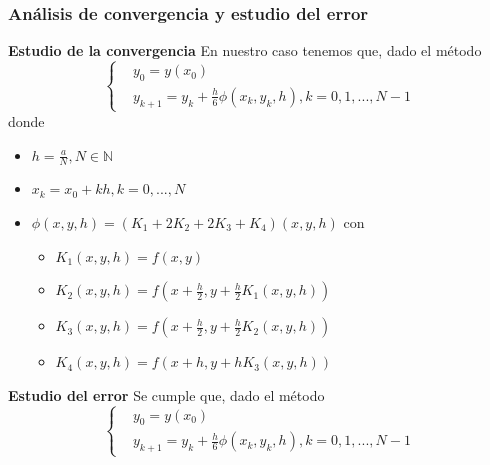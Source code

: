 \documentclass[paper=a4, fontsize=11pt]{scrartcl} %
\numberwithin{equation}{section}
\begin{document}
	\subsubsection{Análisis de convergencia y estudio del error}
	\textbf{Estudio de la convergencia}
	\newline
	En nuestro caso tenemos que, dado el método 
	\begin{equation*}
	[RK4]\begin{cases} 
	&\text{$y_0 = y(x_0)$}
	\\
	&\text{$y_{k+1} = y_k + \frac{h}{6}\phi(x_k,y_k,h) , k= 0,1,...,N-1$} 
	\end{cases} 
	\end{equation*}
	donde
	\begin{itemize}
		\item $h=\frac{a}{N} , N\in\mathbb{N}$
		\item $x_k = x_0 + kh , k=0,...,N$
		\item $\phi(x,y,h) = (K_1+2K_2+2K_3+K_4)(x,y,h)$ con 
		\begin{itemize}
			\item $K_1(x,y,h)=f(x,y)$
			\item $K_2(x,y,h)=f(x+\frac{h}{2},y+\frac{h}{2}K_1(x,y,h))$
			\item $K_3(x,y,h)=f(x+\frac{h}{2},y+\frac{h}{2}K_2(x,y,h))$
			\item $K_4(x,y,h)=f(x+h,y+hK_3(x,y,h))$
		\end{itemize}
	\end{itemize}
	\begin{center}
	\end{center}
	\textbf{Estudio del error}
	\newline Se cumple que, dado el método 
	\begin{equation*}
	[RK4]\begin{cases} 
	&\text{$y_0 = y(x_0)$}
	\\
	&\text{$y_{k+1} = y_k + \frac{h}{6}\phi(x_k,y_k,h) , k= 0,1,...,N-1$} 
	\end{cases} 
	\end{equation*}
\end{document}
